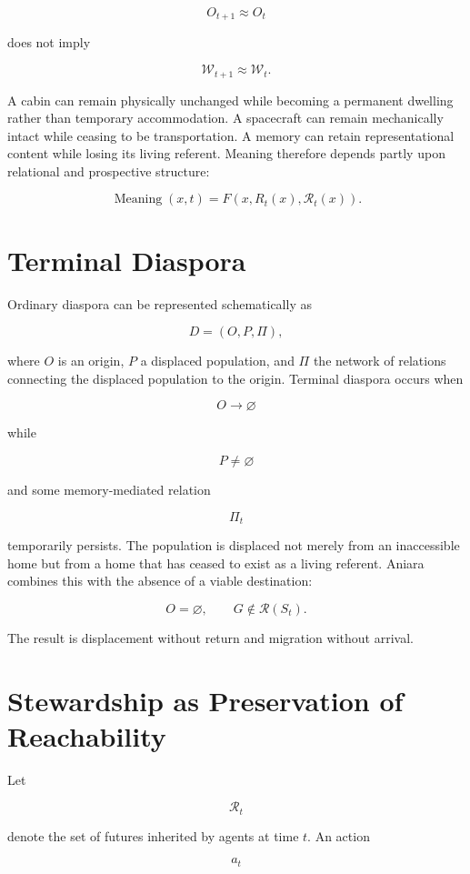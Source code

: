 \documentclass[11pt,oneside]{book}
\theoremstyle{definition}
\theoremstyle{remark}
\begin{document}
\[
O_{t+1}\approx O_t
\]

does not imply

\[
\mathcal{W}_{t+1}\approx\mathcal{W}_t.
\]

A cabin can remain physically unchanged while becoming a permanent dwelling rather than temporary
accommodation. A spacecraft can remain mechanically intact while ceasing to be transportation. A
memory can retain representational content while losing its living referent. Meaning therefore
depends partly upon relational and prospective structure:

\[
\operatorname{Meaning}(x,t) = F\!\left( x, R_t(x), \mathcal{R}_t(x) \right).
\]

\section{Terminal Diaspora}

Ordinary diaspora can be represented schematically as

\[
D=(O,P,\Pi),
\]

where \(O\) is an origin, \(P\) a displaced population, and \(\Pi\) the network of relations
connecting the displaced population to the origin. Terminal diaspora occurs when

\[
O\rightarrow\varnothing
\]

while

\[
P\neq\varnothing
\]

and some memory-mediated relation

\[
\Pi_t
\]

temporarily persists. The population is displaced not merely from an inaccessible home but from a
home that has ceased to exist as a living referent. Aniara combines this with the absence of a
viable destination:

\[
O=\varnothing, \qquad G\notin\mathcal{R}(S_t).
\]

The result is displacement without return and migration without arrival.

\section{Stewardship as Preservation of Reachability}

Let

\[
\mathcal{R}_t
\]

denote the set of futures inherited by agents at time \(t\). An action

\[
a_t
\]
\end{document}
